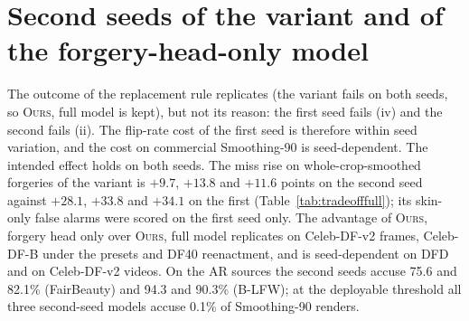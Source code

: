 \documentclass[10pt]{article}
\newcommand{\oursB}{\textsc{Ours}, forgery head only}
\newcommand{\oursF}{\textsc{Ours}, full model}
\begin{document}
\section{Second seeds of the variant and of the forgery-head-only model}
\label{sec:seeds}
\begin{table}[H]
\centering
\caption{The declared replacement criteria of the variant and the declared comparisons of \oursB{} minus \oursF{} on two seeds, each within
its seed (paired video-cluster intervals, 1,000 draws). ``Replicated'': same verdict, or same interval category, on both seeds.}
\label{tab:seeds}
\scriptsize
\begin{adjustbox}{max width=\linewidth}\end{adjustbox}
\end{table}
The outcome of the replacement rule replicates (the variant fails on both seeds, so \oursF{} is kept), but not its reason: the first
seed fails (iv) and the second fails (ii). The flip-rate cost of the first seed is therefore within seed variation, and the cost on
commercial Smoothing-90 is seed-dependent. The intended effect holds on both seeds. The miss rise on whole-crop-smoothed forgeries
of the variant is $+9.7$, $+13.8$ and $+11.6$ points on the second seed against $+28.1$, $+33.8$ and $+34.1$ on the first
(Table~\ref{tab:tradeofffull}); its skin-only false alarms were scored on the first seed only. The advantage of \oursB{} over
\oursF{} replicates on Celeb-DF-v2 frames, Celeb-DF-B under the presets and DF40 reenactment, and is seed-dependent on DFD and on
Celeb-DF-v2 videos. On the AR sources the second seeds accuse 75.6 and 82.1\% (FairBeauty) and 94.3 and 90.3\% (B-LFW); at the
deployable threshold all three second-seed models accuse 0.1\% of Smoothing-90 renders.
\end{document}
